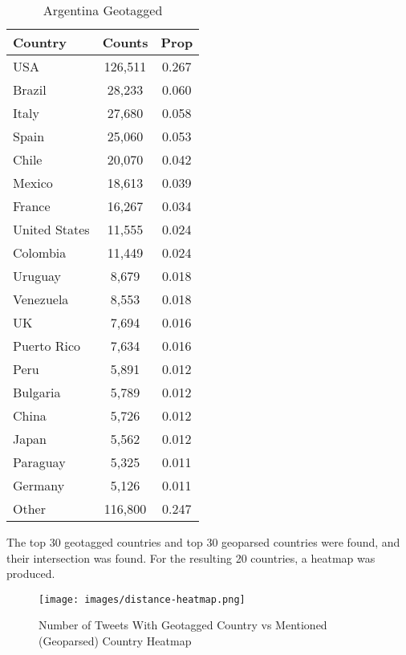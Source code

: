 \begin{table}[H]
\centering
\begin{tabular}{lcc}
\hline
Country & Counts & Prop \\
\hline
USA & 126,511 & 0.267 \\
Brazil & 28,233 & 0.060 \\
Italy & 27,680 & 0.058 \\
Spain & 25,060 & 0.053 \\
Chile & 20,070 & 0.042 \\
Mexico & 18,613 & 0.039 \\
France & 16,267 & 0.034 \\
United States & 11,555 & 0.024 \\
Colombia & 11,449 & 0.024 \\
Uruguay & 8,679 & 0.018 \\
Venezuela & 8,553 & 0.018 \\
UK & 7,694 & 0.016 \\
Puerto Rico & 7,634 & 0.016 \\
Peru & 5,891 & 0.012 \\
Bulgaria & 5,789 & 0.012 \\
China & 5,726 & 0.012 \\
Japan & 5,562 & 0.012 \\
Paraguay & 5,325 & 0.011 \\
Germany & 5,126 & 0.011 \\
Other & 116,800 & 0.247 \\
\hline
\end{tabular}
\caption{Argentina Geotagged}
\label{distances-argentina-geotagged}
\end{table}

The top 30 geotagged countries and top 30 geoparsed countries were found, and their intersection was found. For the resulting 20 countries, a heatmap was produced. 

\begin{figure}[H]
    \centering
    \texttt{[image: images/distance-heatmap.png]}
    
    \caption{Number of Tweets With Geotagged Country vs Mentioned (Geoparsed) Country Heatmap}
    \label{fig:distance-heatmap}
\end{figure}

